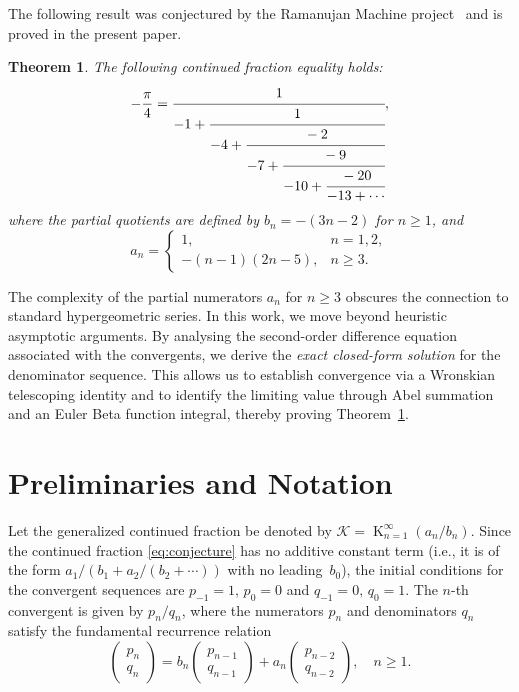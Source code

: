 \documentclass[11pt,reqno]{amsart}
\newtheorem{theorem}{Theorem}[section]
\theoremstyle{definition}
\DeclareMathOperator*{\K}{K}
\begin{document}
The following result was conjectured by the Ramanujan Machine project~\cite{raayoni2021generating} and is proved in the present paper.

\begin{theorem}\label{conj:main}
  The following continued fraction equality holds:
  \begin{equation}\label{eq:conjecture}
    -\frac{\pi}{4}
    = \cfrac{1}{-1 + \cfrac{1}{-4 + \cfrac{-2}{-7 + \cfrac{-9}{-10
          + \cfrac{-20}{-13 + \cdots}}}}},
  \end{equation}
  where the partial quotients are defined by $b_n = -(3n-2)$ for $n\ge 1$,
  and
  \begin{equation}\label{eq:an_def}
    a_n =
    \begin{cases}
      1,               & n = 1, 2,     \\
      -(n-1)(2n-5),    & n \ge 3.
    \end{cases}
  \end{equation}
\end{theorem}

The complexity of the partial numerators $a_n$ for $n\ge 3$ obscures the
connection to standard hypergeometric series. In this work, we move beyond
heuristic asymptotic arguments. By analysing the second-order difference
equation associated with the convergents, we derive the \emph{exact
  closed-form solution} for the denominator sequence. This allows us to
establish convergence via a Wronskian telescoping identity and to identify
the limiting value through Abel summation and an Euler Beta function integral, thereby proving Theorem~\ref{conj:main}.

\section{Preliminaries and Notation}

Let the generalized continued fraction be denoted by
$\mathcal{K} = \K_{n=1}^{\infty}(a_n/b_n)$. Since the continued fraction \eqref{eq:conjecture} has no additive constant term (i.e., it is of the form $a_1/(b_1+a_2/(b_2+\cdots))$ with no leading~$b_0$), the initial conditions for the convergent sequences are $p_{-1}=1,\,p_0=0$ and $q_{-1}=0,\,q_0=1$. The $n$-th convergent is
given by $p_n/q_n$, where the numerators $p_n$ and denominators $q_n$
satisfy the fundamental recurrence relation
\cite[Ch.\,1]{wall1948analytic}
\begin{equation}\label{eq:recurrence}
  \begin{pmatrix} p_n \\ q_n \end{pmatrix}
  = b_n \begin{pmatrix} p_{n-1} \\ q_{n-1} \end{pmatrix}
  + a_n \begin{pmatrix} p_{n-2} \\ q_{n-2} \end{pmatrix},
  \quad n \ge 1.
\end{equation}
\end{document}
